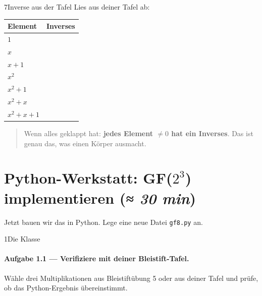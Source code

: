 \begin{bleistiftuebung}{7}{Inverse aus der Tafel}
Lies aus deiner Tafel ab:

\begin{center}
\begin{tabular}{ll}
  \toprule
  Element & Inverses \\
  \midrule
  $1$            & \\
  $x$            & \\
  $x+1$          & \\
  $x^2$          & \\
  $x^2+1$        & \\
  $x^2+x$        & \\
  $x^2+x+1$      & \\
  \bottomrule
\end{tabular}
\end{center}

\begin{quote}
Wenn alles geklappt hat: \textbf{jedes Element $\ne 0$ hat ein
Inverses}. Das ist genau das, was einen Körper ausmacht.
\end{quote}
\end{bleistiftuebung}

\section{Python-Werkstatt: GF($2^3$) implementieren \normalfont(\textit{≈ 30 min})}

Jetzt bauen wir das in Python. Lege eine neue Datei \texttt{gf8.py}
an.

\begin{pythoneinheit}{1}{Die Klasse}

\paragraph{Aufgabe 1.1 — Verifiziere mit deiner Bleistift-Tafel.}
Wähle drei Multiplikationen aus Bleistiftübung 5 oder aus deiner
Tafel und prüfe, ob das Python-Ergebnis übereinstimmt.
\end{pythoneinheit}

